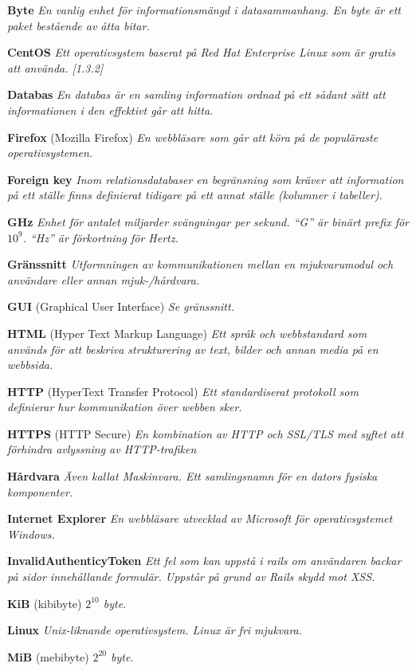 \documentclass[a4paper, twoside, 11pt, titlepage]{article}
\begin{document}
	\textbf{Byte} \emph{En vanlig enhet för informationsmängd i datasammanhang. En byte är ett paket bestående av åtta bitar.}

	\textbf{CentOS} \emph{Ett operativsystem baserat på Red Hat Enterprise Linux som är gratis att använda. [1.3.2]}

	\textbf{Databas} \emph{En databas är en samling information ordnad på ett sådant sätt att informationen i den effektivt går att hitta.}

	\textbf{Firefox} (Mozilla Firefox) \emph{En webbläsare som går att köra på de populäraste operativsystemen.}

	\textbf{Foreign key} \emph{Inom relationsdatabaser en begränsning som kräver att information på ett ställe finns definierat tidigare på ett annat ställe (kolumner i tabeller).}

	\textbf{GHz} \emph{Enhet för antalet miljarder svängningar per sekund. ``G'' är binärt prefix för $10^{9}$. ``Hz'' är förkortning för Hertz.}

	\textbf{Gränssnitt} \emph{Utformningen av kommunikationen mellan en mjukvarumodul och användare eller annan mjuk-/hårdvara.}

	\textbf{GUI} (Graphical User Interface) \emph{Se gränssnitt.}

	\textbf{HTML} (Hyper Text Markup Language) \emph{Ett språk och webbstandard som används för att beskriva strukturering av text, bilder och annan media på en webbsida.}

	\textbf{HTTP} (HyperText Transfer Protocol) \emph{Ett standardiserat protokoll som definierar hur kommunikation över webben sker.}

	\textbf{HTTPS} (HTTP Secure) \emph{En kombination av HTTP och SSL/TLS med syftet att förhindra avlyssning av HTTP-trafiken}

	\textbf{Hårdvara} \emph{Även kallat Maskinvara. Ett samlingsnamn för en dators fysiska komponenter.}

	\textbf{Internet Explorer} \emph{En webbläsare utvecklad av Microsoft för operativsystemet Windows.}

	\textbf{InvalidAuthenticyToken} \emph{Ett fel som kan uppstå i rails om användaren backar på sidor innehållande formulär. Uppstår på grund av Rails skydd mot XSS.}

	\textbf{KiB} (kibibyte) \emph{$2^{10}$ byte.}

	\textbf{Linux} \emph{Unix-liknande operativsystem. Linux är fri mjukvara.}

	\textbf{MiB} (mebibyte) \emph{$2^{20}$ byte.}
\end{document}
